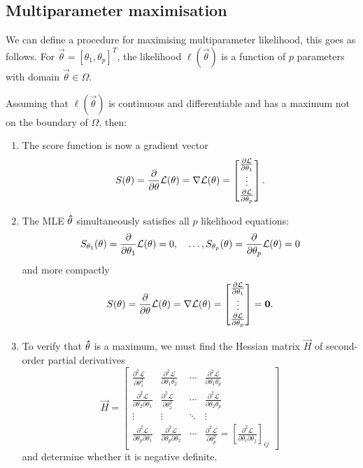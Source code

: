 \documentclass[10pt, a4paper]{article}
\begin{document}
\subsection{Multiparameter maximisation}
We can define a procedure for maximising multiparameter likelihood,
this goes as follows.
For $\vec{\theta} = [\theta_1, \theta_p] ^ T$,
the likelihood $\ell(\vec{\theta})$ is a function of $p$ parameters with domain $\vec{\theta} \in \Omega$.

Assuming that $\ell(\vec{\theta})$ is continuous and differentiable and has a maximum not on the boundary of $\Omega$,
then:
\begin{enumerate}[label = \arabic*.]
    \item The score function is now a gradient vector
    \[
    S(\vec{\theta}) = \pd{\vec{\theta}}\mathcal{L}(\vec{\theta}) = \nabla\mathcal{L}(\vec{\theta}) = \begin{bmatrix}
        \pd[\mathcal{L}]{\theta_1} \\ \vdots \\ \pd[\mathcal{L}]{\theta_p}
    \end{bmatrix}.
    \]

    \item The MLE $\hvec{\theta}$ simultaneously satisfies all $p$ likelihood equations:
    \[
    S_{\theta_1}(\vec{\theta}) = \pd{\theta_1}\mathcal{L}(\vec{\theta}) = 0,\quad\dotsc, S_{\theta_p}(\vec{\theta}) = \pd{\theta_p}\mathcal{L}(\vec{\theta}) = 0
    \]
    and more compactly
    \[
    S(\vec{\theta}) = \pd{\vec{\theta}}\mathcal{L}(\vec{\theta}) = \nabla\mathcal{L}(\vec{\theta}) = \begin{bmatrix}
        \pd[\mathcal{L}]{\theta_1} \\ \vdots \\ \pd[\mathcal{L}]{\theta_p}
    \end{bmatrix} = \vec{0}.
    \]

    \item To verify that $\hvec{\theta}$ is a maximum,
    we must find the Hessian matrix $\vec{H}$ of second-order partial derivatives
    \[
    \vec{H} = \begin{bmatrix}
        \frac{\partial ^ 2\mathcal{L}}{\partial \theta_1 ^ 2} & \frac{\partial ^ 2\mathcal{L}}{\partial \theta_1\theta_2} & \dotsi & \frac{\partial ^ 2\mathcal{L}}{\partial \theta_1\theta_p} \\
        \frac{\partial ^ 2\mathcal{L}}{\partial \theta_2\partial\theta_1} & \frac{\partial ^ 2\mathcal{L}}{\partial \theta_2 ^ 2} & \dotsi & \frac{\partial ^ 2\mathcal{L}}{\partial \theta_2\theta_p} \\
        \vdots & \vdots & \ddots & \vdots \\
        \frac{\partial ^ 2\mathcal{L}}{\partial \theta_p\partial\theta_1} & \frac{\partial ^ 2\mathcal{L}}{\partial \theta_p\partial\theta_2} & \dotsi & \frac{\partial ^ 2\mathcal{L}}{\partial \theta_p ^ 2} = \left[\frac{\partial ^ 2\mathcal{L}}{\partial\theta_i\partial\theta_j}\right]_{ij}
    \end{bmatrix}
    \]
    and determine whether it is negative definite.
\end{enumerate}
\end{document}
